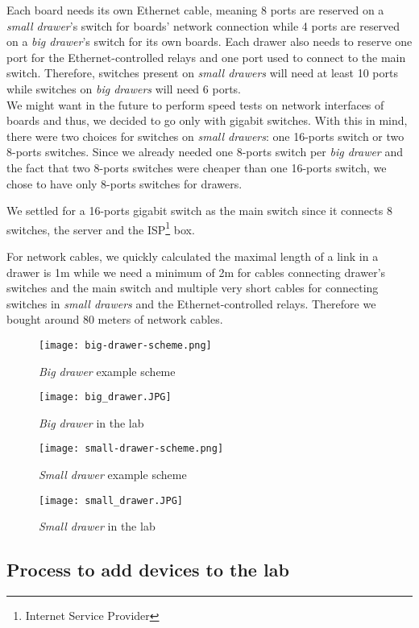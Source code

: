 Each board needs its own Ethernet cable, meaning 8 ports are reserved on a \textit{small drawer}'s switch for boards' network connection while 4 ports are reserved on a \textit{big drawer}'s switch for its own boards. Each drawer also needs to reserve one port for the Ethernet-controlled relays and one port used to connect to the main switch. Therefore, switches present on \textit{small drawers} will need at least 10 ports while switches on \textit{big drawers} will need 6 ports.\\
We might want in the future to perform speed tests on network interfaces of boards and thus, we decided to go only with gigabit switches. With this in mind, there were two choices for switches on \textit{small drawers}: one 16-ports switch or two 8-ports switches. Since we already needed one 8-ports switch per \textit{big drawer} and the fact that two 8-ports switches were cheaper than one 16-ports switch, we chose to have only 8-ports switches for drawers.

We settled for a 16-ports gigabit switch as the main switch since it connects 8 switches, the server and the ISP\footnote{Internet Service Provider} box.

For network cables, we quickly calculated the maximal length of a link in a drawer is 1m while we need a minimum of 2m for cables connecting drawer's switches and the main switch and multiple very short cables for connecting switches in \textit{small drawers} and the Ethernet-controlled relays. Therefore we bought around 80 meters of network cables.

\begin{figure}[H]
  \centering
  \texttt{[image: big-drawer-scheme.png]}
  \caption{\textit{Big drawer} example scheme}
\end{figure}
\begin{figure}[H]
  \texttt{[image: big\_drawer.JPG]}
  \caption{\textit{Big drawer} in the lab}
\end{figure}
\begin{figure}[H]
  \centering
  \texttt{[image: small-drawer-scheme.png]}
  \caption{\textit{Small drawer} example scheme}
\end{figure}
\begin{figure}[H]
  \texttt{[image: small\_drawer.JPG]}
  \caption{\textit{Small drawer} in the lab}
\end{figure}

\subsection{Process to add devices to the lab}

